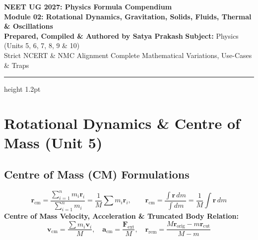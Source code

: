 \documentclass[11pt,a4paper]{article}
\begin{document}
\begin{center}
  {\huge\bfseries\color{primarydark} NEET UG 2027: Physics Formula Compendium}\\[6pt]
  {\Large\bfseries\color{accentblue} Module 02: Rotational Dynamics, Gravitation, Solids, Fluids, Thermal \& Oscillations}\\[8pt]
  {\normalsize\textbf{Prepared, Compiled \& Authored by Satya Prakash} \quad\textbar\quad \textbf{Subject:} Physics (Units 5, 6, 7, 8, 9 \& 10)}\\[4pt]
  {\footnotesize\color{gray} Strict NCERT \& NMC Alignment \quad\textbar\quad Complete Mathematical Variations, Use-Cases \& Traps}
\end{center}
\vspace{-2pt}
\hrule height 1.2pt
\vspace{8pt}

\section{Rotational Dynamics \& Centre of Mass (Unit 5)}

\subsection{Centre of Mass (CM) Formulations}

\begin{formulabox}
\begin{equation}
  \mathbf{r}_{\text{cm}} = \frac{\sum_{i=1}^n m_i \mathbf{r}_i}{\sum_{i=1}^n m_i} = \frac{1}{M}\sum m_i \mathbf{r}_i, \qquad \mathbf{r}_{\text{cm}} = \frac{\int \mathbf{r}\,dm}{\int dm} = \frac{1}{M}\int \mathbf{r}\,dm
\end{equation}
\textbf{Centre of Mass Velocity, Acceleration \& Truncated Body Relation:}
\begin{equation}
  \mathbf{v}_{\text{cm}} = \frac{\sum m_i \mathbf{v}_i}{M}, \quad \mathbf{a}_{\text{cm}} = \frac{\mathbf{F}_{\text{ext}}}{M}, \quad \mathbf{r}_{\text{rem}} = \frac{M\mathbf{r}_{\text{orig}} - m\mathbf{r}_{\text{cut}}}{M - m}
\end{equation}
\end{formulabox}
\end{document}
